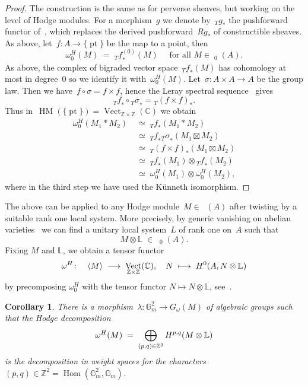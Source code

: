 \documentclass[a4paper]{amsart}
\newcommand{\bbC}{\mathbb{C}}
\newcommand{\bbG}{\mathbb{G}}
\newcommand{\bbL}{\mathbb{L}}
\newcommand{\bbZ}{\mathbb{Z}}
\newcommand{\rH}{\textup{H}}
\newcommand{\sssT}{\scriptscriptstyle{T}}
\newcommand{\tf}[1]{{_{\sssT}{#1}}}
\newcommand{\too}{\longrightarrow}
\newcommand{\iso}{\simeq}
\DeclareMathOperator{\Vect}{Vect}
\DeclareMathOperator{\Hom}{Hom}
\DeclareMathOperator{\pt}{pt}
\DeclareMathOperator{\HM}{HM}
\DeclareMathOperator{\Mbar}{\overline{\HM}}
\theoremstyle{plain}
\newtheorem{corollary}[theorem]{Corollary}
\theoremstyle{definition}
\numberwithin{equation}{section}
\begin{document}
\begin{proof} 
The construction is the same as for perverse sheaves, but working on the level of Hodge modules. For a morphism~$g$ we denote by~$\tf{g}_*$ the pushforward functor of~\cite[def.~12.7.35]{MHMProject}, which replaces the derived pushforward~$Rg_*$ of constructible sheaves.
As above, let~$f\colon A \to \{\pt\}$ be the map to a point, then
%
\[ \omega_0^H(M) \;=\; \tf{f}^{(0)}_* (M)  
\quad \text{ for all~$M\in \Mbar_0(A)$.}
\]
%
As above, the complex of bigraded vector space~$\tf{f}_* (M)$ has cohomology at most in degree~$0$ so we identify it with~$\omega_0^H(M)$. 
Let~$\sigma\colon A\times A \to A$ be the group law. Then we have~$f\circ \sigma = f\times f$, hence the Leray spectral sequence~\cite[cor.~12.7.38]{MHMProject} gives
%
\[
 \tf{f}_* \circ \tf{\sigma}_* = \tf{(f\times f)}_*.
\]
%
Thus in~$\HM(\{\pt\})=\Vect_{\bbZ\times \bbZ}(\bbC)$ we obtain
%
\begin{align*} 
 \omega_0^H(M_1 * M_2) 
 &\;\iso\; \tf{f}_* (M_1 * M_2)
 \\[0.2em]
 &\;\simeq\;   \tf{f}_* \tf{\sigma}_* (M_1 \boxtimes M_2) 
 \\[0.2em]
 &\;\simeq\;  \tf{(f\times f)}_* (M_1\boxtimes M_2) 
 \\[0.2em]
 &\;\simeq\; \tf{f}_*(M_1) \otimes \tf{f}_*(M_2)  
 \\[0.2em]
 &\;\iso\; \omega_0^H(M_1) \otimes \omega_0^H(M_2),
\end{align*} 
%
where in the third step we have used the K\"unneth isomorphism.
\end{proof} 


The above can be applied to any Hodge module~$M\in \Mbar(A)$ after twisting by a suitable rank one local system. More precisely, by generic vanishing on abelian varieties~\cite{KWVanishing, SchnellHolonomic} we can find a unitary local system~$L$ of rank one on~$A$ such that 
%
\[
 M\otimes \bbL \;\in\; \Mbar_0(A).
\]
%
Fixing $M$ and $\bbL$, we obtain a tensor functor
%
\[
 \omega^H\colon \quad \langle M\rangle \;\too\; \Vect_{\bbZ\times \bbZ}(\bbC), \quad N \;\longmapsto\; \rH^0(A, N\otimes \bbL)
\]
%
by precomposing $\omega_0^H$ with the tensor functor $N\mapsto N\otimes \bbL$, see~\cite[prop.~4.1]{KWVanishing}.

\begin{corollary} \label{cor:hodge-cocharacter}
There is a morphism~$\lambda \colon \bbG_m^2 \to G_\omega(M)$ of algebraic groups such that the Hodge decomposition
%
\[
 \omega^H(M) \;=\; \bigoplus_{(p,q)\in \bbZ^2} \rH^{p,q}(M\otimes \bbL)
\]
%
is the decomposition in weight spaces for the characters~$(p,q)\in \bbZ^2 = \Hom(\bbG_m^2, \bbG_m)$.
\end{corollary} 
\end{document}
